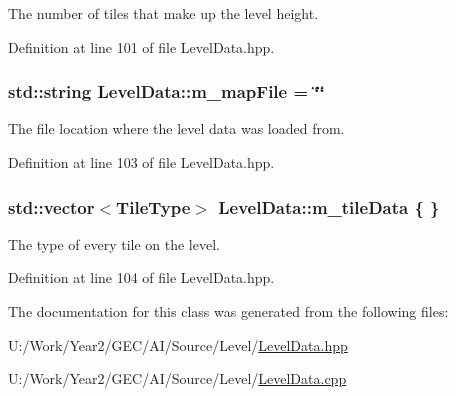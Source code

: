 The number of tiles that make up the level height. 



Definition at line 101 of file Level\+Data.\+hpp.

\hypertarget{classLevelData_a65e6372aea8e8d29fe9a554653a1ad24}{
\subsubsection[{m\+\_\+map\+File}]{\setlength{\rightskip}{0pt plus 5cm}std\+::string Level\+Data\+::m\+\_\+map\+File = \char`\"{}\char`\"{}\hspace{0.3cm}{\ttfamily [private]}}}\label{classLevelData_a65e6372aea8e8d29fe9a554653a1ad24}


The file location where the level data was loaded from. 



Definition at line 103 of file Level\+Data.\+hpp.

\hypertarget{classLevelData_a32b98877ba76059d320053f55dd97051}{
\subsubsection[{m\+\_\+tile\+Data}]{\setlength{\rightskip}{0pt plus 5cm}std\+::vector$<${\bf Tile\+Type}$>$ Level\+Data\+::m\+\_\+tile\+Data \{ \}\hspace{0.3cm}{\ttfamily [private]}}}\label{classLevelData_a32b98877ba76059d320053f55dd97051}


The type of every tile on the level. 



Definition at line 104 of file Level\+Data.\+hpp.



The documentation for this class was generated from the following files\+:\begin{DoxyCompactItemize}
\item 
U\+:/\+Work/\+Year2/\+G\+E\+C/\+A\+I/\+Source/\+Level/\hyperlink{LevelData_8hpp}{Level\+Data.\+hpp}\item 
U\+:/\+Work/\+Year2/\+G\+E\+C/\+A\+I/\+Source/\+Level/\hyperlink{LevelData_8cpp}{Level\+Data.\+cpp}\end{DoxyCompactItemize}
